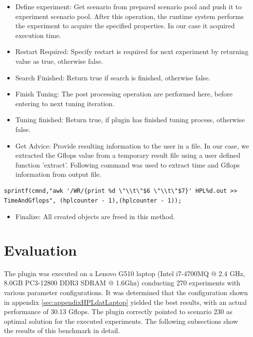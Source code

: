 \documentclass[10pt,twocolumn]{article}
\begin{document}
\begin{itemize}


\item Define experiment: Get scenario from prepared scenario pool and push it to experiment scenario pool. After this operation, the runtime system performs the experiment to acquire the specified properties. In our case it acquired execution time.

\item Restart Required: Specify restart is required for next experiment by returning value as true, otherwise false.

\item Search Finished: Return true if search is finished, otherwise false.

\item Finish Tuning: The post processing operation are performed here, before entering to next tuning iteration.

\item Tuning finished: Return true, if plugin has finished tuning process, otherwise false.

\item Get Advice: Provide resulting information to the user in a file. In our case, we extracted the Gflops value from a temporary result file using a user defined function 'extract'. Following command was used to extract time and Gflops information from output file.
\end{itemize}

\begin{lstlisting}
sprintf(cmnd,"awk '/WR/{print %d \"\\t\"$6 \"\\t\"$7}' HPL%d.out >> TimeAndGflops", (hplcounter - 1),(hplcounter - 1)); 
\end{lstlisting}

\begin{itemize}

\item Finalize: All created objects are freed in this method.

\end{itemize}


\section{Evaluation}
\label{sec:evaluation}
The plugin was executed on a Lenovo G510 laptop (Intel i7-4700MQ $@$ 2.4 GHz, 8.0GB PC3-12800 DDR3 SDRAM $@$ 1.6Ghz) conducting 270 experiments with various parameter configurations. It was determined that the configuration shown in appendix \ref{sec:appendixHPLdatLaptop} yielded the best results, with an actual performance of 30.13 Gflops. The plugin correctly pointed to scenario 230 as optimal solution for the executed experiments. The following subsections show the results of this benchmark in detail.
\end{document}
